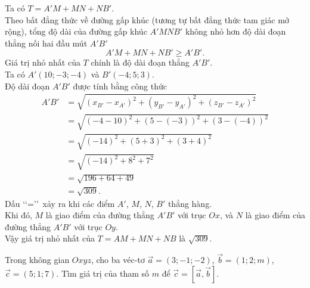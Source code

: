 \begin{ex}
{\begin{enumerate}[1.]
			Ta có $T=A'M+MN+NB'$. \\
			Theo bất đẳng thức về đường gấp khúc (tương tự bất đẳng thức tam giác mở rộng), tổng độ dài của đường gấp khúc $A'MNB'$ không nhỏ hơn độ dài đoạn thẳng nối hai đầu mút $A'B'$
			\begin{equation*}
				A'M + MN + NB' \geq A'B'.
			\end{equation*}
			Giá trị nhỏ nhất của $T$ chính là độ dài đoạn thẳng $A'B'$. \\
			Ta có $A'(10;-3;-4)$ và $B'(-4;5;3)$.\\
			Độ dài đoạn $A'B'$ được tính bằng công thức
			\begin{align*}
				A'B' &= \sqrt{(x_{B'} - x_{A'})^2 + (y_{B'} - y_{A'})^2 + (z_{B'} - z_{A'})^2} \\
				&= \sqrt{(-4-10)^2 + (5-(-3))^2 + (3-(-4))^2} \\
				&= \sqrt{(-14)^2 + (5+3)^2 + (3+4)^2} \\
				&= \sqrt{(-14)^2 + 8^2 + 7^2} \\
				&= \sqrt{196 + 64 + 49} \\
				&= \sqrt{309}.
			\end{align*}
			Dấu \lq\lq=\rq\rq~xảy ra khi các điểm $A'$, $M$, $N$, $B'$ thẳng hàng.\\ Khi đó, $M$ là giao điểm của đường thẳng $A'B'$ với trục $Ox$, và $N$ là giao điểm của đường thẳng $A'B'$ với trục $Oy$.\\
			Vậy giá trị nhỏ nhất của $T=AM+MN+NB$ là $\sqrt{309}$.
		\end{enumerate}
	}
\end{ex}

\begin{ex}%
	Trong không gian $Oxyz$, cho ba véc-tơ $\vec{a}= (3; -1; -2)$, $\vec{b}= (1; 2; m)$, $\vec{c}= (5; 1; 7)$. Tìm giá trị của tham số $m$ để $\vec{c}= \left[ \vec{a}, \vec{b}\right]$.
\end{ex}

